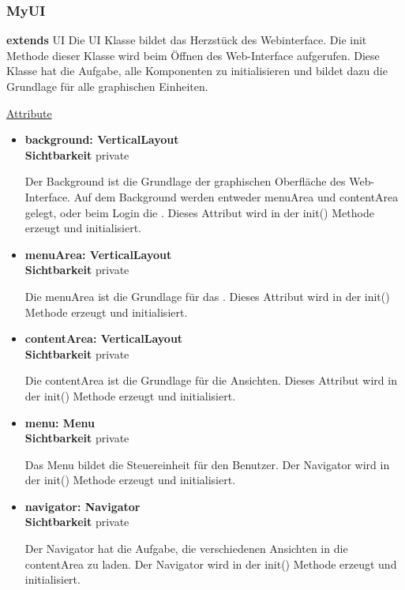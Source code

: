 \subsubsection{MyUI}\label{MyUI}
\textbf{extends} UI \newline
Die UI Klasse bildet das Herzstück des Webinterface. Die init Methode dieser Klasse wird beim Öffnen des Web-Interface aufgerufen. Diese Klasse hat die Aufgabe, alle Komponenten zu initialisieren und bildet dazu die Grundlage für alle graphischen Einheiten.
\newline

\underline{Attribute}
\begin{itemize}
\itemsep0pt

\item \textbf{background: VerticalLayout} \hfill\\ 
\textbf{Sichtbarkeit} private

Der Background ist die Grundlage der graphischen Oberfläche des Web-Interface. Auf dem Background werden entweder menuArea und contentArea gelegt, oder beim Login die . Dieses Attribut wird in der init() Methode erzeugt und initialisiert.

\item \textbf{menuArea: VerticalLayout} \hfill\\ 
\textbf{Sichtbarkeit} private

Die menuArea ist die Grundlage für das . Dieses Attribut wird in der init() Methode erzeugt und initialisiert.

\item \textbf{contentArea: VerticalLayout} \hfill\\ 
\textbf{Sichtbarkeit} private

Die contentArea ist die Grundlage für die Ansichten. Dieses Attribut wird in der init() Methode erzeugt und initialisiert.

\item \textbf{menu: Menu} \hfill\\
\textbf{Sichtbarkeit} private
 
Das Menu bildet die Steuereinheit für den Benutzer. Der Navigator wird in der init() Methode erzeugt und initialisiert.

\item \textbf{navigator: Navigator} \hfill\\ 
\textbf{Sichtbarkeit} private

Der Navigator hat die Aufgabe, die verschiedenen Ansichten in die contentArea zu laden. Der Navigator wird in der init() Methode erzeugt und initialisiert.

\end{itemize}

